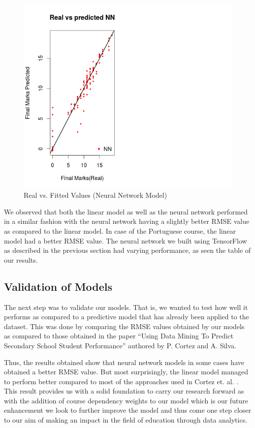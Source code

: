 \documentclass[conference]{IEEEtran}
\begin{document}
\begin{figure}
	\includegraphics[width=\linewidth]{math_nn.png}
	\caption{Real vs. Fitted Values (Neural Network Model)}
	\label{fig:math-nn}
\end{figure}

We observed that both the linear model as well as the neural network performed in a similar fashion with the neural network having a slightly better RMSE value as compared to the linear model. In case of the Portuguese course, the linear model had a better RMSE value. The neural network we built using TensorFlow \cite{tensorflow2015-whitepaper} as described in the previous section had varying performance, as seen the table of our results.

	\subsection{Validation of Models}
The next step was to validate our models. That is, we wanted to test how well it
performs as compared to a predictive model that has already been applied to the
dataset. This was done by comparing the RMSE values obtained by our models as compared to those obtained in the paper “Using Data Mining To Predict Secondary
School Student Performance” authored by P. Cortez and A. Silva.


Thus, the results obtained show that neural network models in some cases have 
obtained a better RMSE value. But most surprisingly, the linear model managed to perform better compared to most of the approaches used in Cortez et. al. \cite{Ref4:}. This result provides us with a solid foundation to carry our research forward as with the addition of course dependency weights to our model which is our future enhancement we look to further improve the model and thus come one step closer to our aim of making an impact in the field of education through data analytics.
\end{document}
